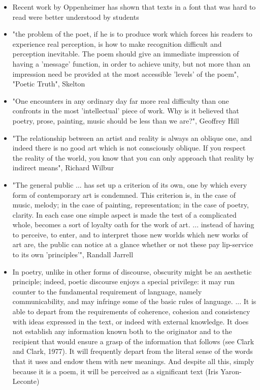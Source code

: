 \documentclass[11pt]{article}
\begin{document}
 \begin{itemize} 
\item Recent work by
Oppenheimer has shown that texts in a font that was hard to read were
better understood by students 
\item "the problem of the poet, if he is                             
to produce work which forces his readers to experience real perception, is                            
how to make recognition difficult and perception inevitable. The poem                                 
should give an immediate impression of having a 'message' function, in                                
order to achieve unity, but not more than an impression need be provided at                           
the most accessible 'levels' of the poem", "Poetic Truth", Skelton
\item "One encounters in any ordinary day far more real difficulty than one                             
confronts in the most 'intellectual' piece of work. Why is it believed that                           
poetry, prose, painting, music should be less than we are?", Geoffrey
Hill 
\item "The relationship between an artist and reality is always an                            
oblique one, and indeed there is no good art which is not consciously                                 
oblique. If you respect the reality of the world, you know that you can                               
only approach that reality by indirect means", Richard Wilbur
\item "The general public ... has set up a criterion of its own, one by which                           
every form of contemporary art is condemned. This criterion is, in the case                           
of music, melody; in the case of painting, representation; in the case of                             
poetry, clarity. In each case one simple aspect is made the test of a                                 
complicated whole, becomes a sort of loyalty oath for the work of art. ...                            
instead of having to perceive, to enter, and to interpret those new worlds                            
which new works of art are, the public can notice at a glance whether or          
not these pay lip-service to its own 'principles'", Randall Jarrell
\item In poetry, unlike in other forms of discourse, obscurity might be an aesthetic principle; indeed, poetic discourse enjoys a special privilege: it may run counter to the fundamental requirement of language, namely communicability, and may infringe some of the basic rules of language. ... It is able to depart from the requirements of coherence, cohesion and consistency with ideas expressed in the text, or indeed with external knowledge. It does not establish any information known both to the originator and to the recipient that would ensure a grasp of the information that follows (see Clark and Clark, 1977). It will frequently depart from the literal sense of the words that it uses and endow them with new meanings. And despite all this, simply because it is a poem, it will be perceived as a significant text (Iris Yaron-Leconte)

\end{itemize}
\end{document}
